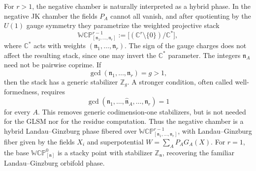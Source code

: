 \documentclass[11pt,a4paper]{article}
\numberwithin{equation}{section}
\theoremstyle{plain}
\theoremstyle{definition}
\theoremstyle{remark}
\begin{document}
For \(r>1\), the negative chamber is naturally interpreted as a hybrid phase. In the negative JK  chamber the fields \(P_A\) cannot all vanish, and after quotienting by the \(U(1)\) gauge symmetry they parametrize the weighted projective stack
\begin{equation}
\mathbb{WCP}^{r-1}_{[\mathfrak n_1,\ldots,\mathfrak n_r]}
:=
\bigl[(\mathbb C^r\setminus\{0\})/\mathbb C^\ast\bigr],
\end{equation}
where \(\mathbb C^\ast\) acts with weights \((\mathfrak n_1,\ldots,\mathfrak n_r)\). The sign of the gauge charges does not affect the resulting stack, since one may invert the \(\mathbb C^\ast\) parameter. The integers \(\mathfrak n_A\) need not be pairwise coprime. If
\begin{equation}
\gcd(\mathfrak n_1,\ldots,\mathfrak n_r)=g>1,
\end{equation}
then the stack has a generic stabilizer \(\mathbb Z_g\). A stronger condition, often called well-formedness, requires
\begin{equation}
\gcd(\mathfrak n_1,\ldots,\widehat{\mathfrak n}_A,\ldots,\mathfrak n_r)=1
\end{equation}
for every \(A\). This removes generic codimension-one stabilizers, but is not needed for the GLSM nor for the residue computation. Thus the negative chamber is a hybrid Landau--Ginzburg phase fibered over \(\mathbb{WCP}^{r-1}_{[\mathfrak n_1,\ldots,\mathfrak n_r]}\), with Landau--Ginzburg fiber given by the fields \(X_i\) and superpotential \(W=\sum_A P_A G_A(X)\). For \(r=1\), the base \(\mathbb{WCP}^{0}_{[\mathfrak n]}\) is a stacky point with stabilizer \(\mathbb Z_{\mathfrak n}\), recovering the familiar Landau--Ginzburg orbifold phase.
\end{document}
